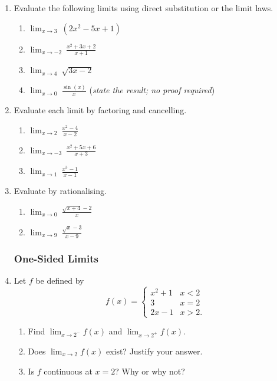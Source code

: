 \begin{enumerate}

\item Evaluate the following limits using direct substitution or
      the limit laws.
      \begin{enumerate}
        \item $\displaystyle\lim_{x \to 3}\ (2x^2 - 5x + 1)$
        \item $\displaystyle\lim_{x \to -2}\ \frac{x^2 + 3x + 2}{x + 1}$
        \item $\displaystyle\lim_{x \to 4}\ \sqrt{3x - 2}$
        \item $\displaystyle\lim_{x \to 0}\ \frac{\sin(x)}{x}$
              \quad (\textit{state the result; no proof required})
      \end{enumerate}

\item Evaluate each limit by factoring and cancelling.
      \begin{enumerate}
        \item $\displaystyle\lim_{x \to 2}\ \frac{x^2 - 4}{x - 2}$
        \item $\displaystyle\lim_{x \to -3}\ \frac{x^2 + 5x + 6}{x + 3}$
        \item $\displaystyle\lim_{x \to 1}\ \frac{x^3 - 1}{x - 1}$
      \end{enumerate}

\item Evaluate by rationalising.
      \begin{enumerate}
        \item $\displaystyle\lim_{x \to 0}\ \frac{\sqrt{x + 4} - 2}{x}$
        \item $\displaystyle\lim_{x \to 9}\ \frac{\sqrt{x} - 3}{x - 9}$
      \end{enumerate}

\subsubsection*{One-Sided Limits}

\item Let $f$ be defined by
      \[
        f(x) =
        \begin{cases}
          x^2 + 1 & x < 2 \\
          3       & x = 2 \\
          2x - 1  & x > 2.
        \end{cases}
      \]
      \begin{enumerate}
        \item Find $\displaystyle\lim_{x \to 2^-} f(x)$ and
              $\displaystyle\lim_{x \to 2^+} f(x)$.
        \item Does $\displaystyle\lim_{x \to 2} f(x)$ exist?
              Justify your answer.
        \item Is $f$ continuous at $x = 2$? Why or why not?
      \end{enumerate}


\end{enumerate}
